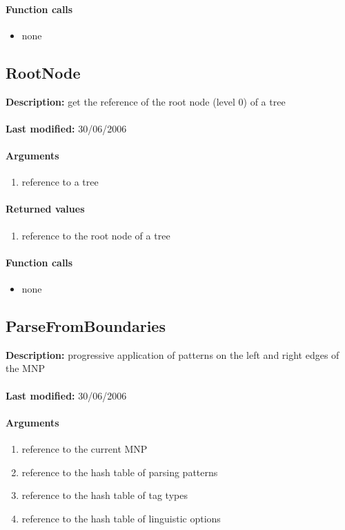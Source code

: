 \paragraph{Function calls}
\begin{itemize}
\item none
\end{itemize}

\subsection{RootNode}
\textbf{Description:} get the reference of the root node (level 0) of a tree\\
\\\textbf{Last modified:} 30/06/2006

\paragraph{Arguments}
\begin{enumerate}
\item reference to a tree
\end{enumerate}

\paragraph{Returned values}
\begin{enumerate}
\item reference to the root node of a tree
\end{enumerate}

\paragraph{Function calls}
\begin{itemize}
\item none
\end{itemize}

\subsection{ParseFromBoundaries}
\textbf{Description:} progressive application of patterns on the left and right edges of the MNP\\
\\\textbf{Last modified:} 30/06/2006

\paragraph{Arguments}
\begin{enumerate}
\item reference to the current MNP
\item reference to the hash table of parsing patterns
\item reference to the hash table of tag types
\item reference to the hash table of linguistic options
\end{enumerate}

